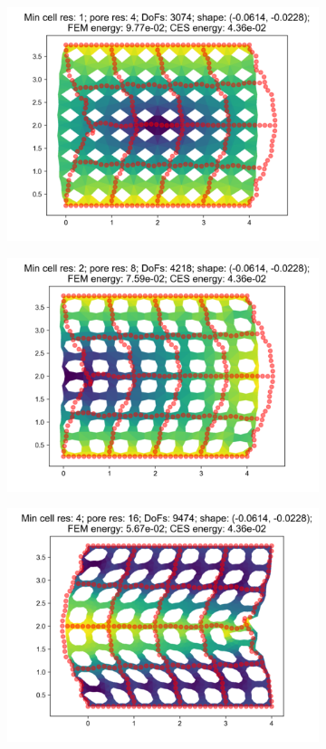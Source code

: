 \begin{figure}[H]
\begin{subfigure}{.45\textwidth}
  \centering
  \includegraphics[width=.8\linewidth]{lces/vis_compression/bm_4_mesh_0.png}
\end{subfigure}
\begin{subfigure}{.45\textwidth}
  \centering
  \includegraphics[width=.8\linewidth]{lces/vis_compression/bm_4_mesh_1.png}
\end{subfigure}
\newline
\begin{subfigure}{.45\textwidth}
  \centering
  \includegraphics[width=.8\linewidth]{lces/vis_compression/bm_4_mesh_2.png}

\end{subfigure}
\end{figure}
